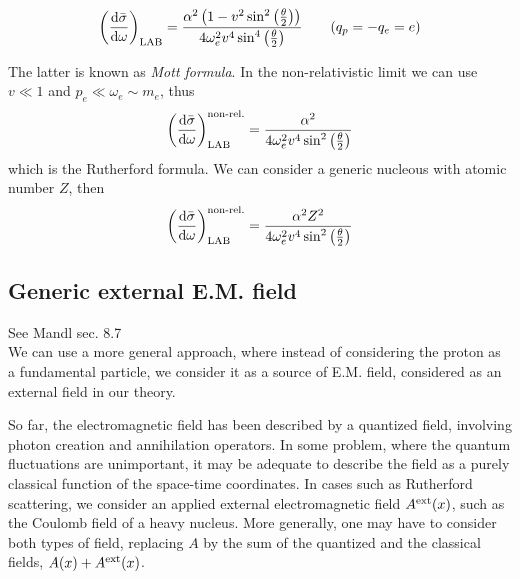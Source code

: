 \documentclass[TheoreticalPhy_ModB.tex]{subfiles}
\begin{document}
\[\left(\frac{\textup{d}\bar\sigma}{\textup{d}\omega}\right)_{\textup{LAB}}=\frac{\alpha^2\left(1-v^2\sin^2\left(\frac\theta2\right)\right)}{4\omega_e^2v^4\sin^4\left(\frac\theta2\right)}\qquad (q_p=-q_e=e)\]

The latter is known as \emph{Mott formula}. In the non-relativistic limit we can use $v\ll1$ and $p_e\ll\omega_e\sim m_e$, thus
\[\left(\frac{\textup{d}\bar\sigma}{\textup{d}\omega}\right)_{\textup{LAB}}^{\textup{non-rel.}}=\frac{\alpha^2}{4\omega_e^2v^4\sin^2\left(\frac\theta2\right)}\]
which is the Rutherford formula. We can consider a generic nucleous with atomic number $Z$, then
\[\left(\frac{\textup{d}\bar\sigma}{\textup{d}\omega}\right)_{\textup{LAB}}^{\textup{non-rel.}}=\frac{\alpha^2Z^2}{4\omega_e^2v^4\sin^2\left(\frac\theta2\right)}\]

\subsection{Generic external E.M. field}\label{sec:3-ext_EM_field}
\textsf{See Mandl sec. 8.7}\\
We can use a more general approach, where instead of considering the proton as a fundamental particle, we consider it as a source of E.M. field, considered as an external field in our theory. 

So far, the electromagnetic field has been described by a quantized field, involving photon creation and annihilation operators. In some problem, where the quantum fluctuations are unimportant, it may be adequate to describe the field as a purely classical function of the space-time coordinates. In cases such as Rutherford scattering, we consider an applied external electromagnetic field $A^\textup{ext}(x)$, such as the Coulomb field of a heavy nucleus. More generally, one may have to consider both types of field, replacing $A$ by the sum of the quantized and the classical fields, $A(x)+A^{\textup{ext}}(x)$.
\end{document}
